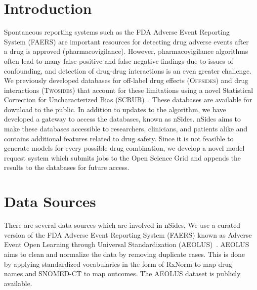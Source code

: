 \documentclass{ws-procs11x85}
\begin{document}
\bodymatter

\section{Introduction}

Spontaneous reporting systems such as the FDA Adverse Event Reporting System (FAERS) are important resources for detecting drug adverse events after a drug is approved (pharmacovigilance). However, pharmacovigilance algorithms often lead to many false positive and false negative findings due to issues of confounding, and detection of drug-drug interactions is an even greater challenge.
We previously developed databases for off-label drug effects (O\textsc{ffsides}) and drug interactions (T\textsc{wosides}) that account for these limitations using a novel Statistical Correction for Uncharacterized Bias (SCRUB)~\cite{Tatonetti2012}.  These databases are available for download to the public.  In addition to updates to the algorithm, we have developed a gateway to access the databases, known as nSides.
nSides aims to make these databases accessible to researchers, clinicians, and patients alike and contains additional features related to drug safety.
Since it is not feasible to generate models for every possible drug combination, we develop a novel model request system which submits jobs to the Open Science Grid and appends the results to the databases for future access.

\section{Data Sources}

There are several data sources which are involved in nSides. We use a
curated version of the FDA Adverse Event Reporting System (FAERS)
known as Adverse Event Open Learning through Universal Standardization
(AEOLUS)~\cite{AEOLUS}.  AEOLUS aims to clean and normalize the data
by removing duplicate cases. This is done by applying standardized
vocabularies in the form of RxNorm to map drug names and SNOMED-CT to
map outcomes. The AEOLUS dataset is publicly available.
\end{document}
